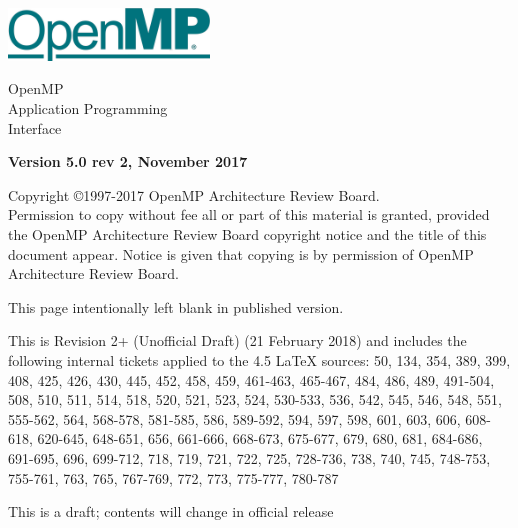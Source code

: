 
  \begin{titlepage}
    \begin{flushleft}
     \hspace{-6em} \includegraphics[width=0.4\textwidth]{openmp-logo.png}
    \end{flushleft}

    \begin{adjustwidth}{-0.75in}{0in}
    \begin{center}
      \Huge
      \textsf{OpenMP\\Application Programming\\Interface}

      \vspace{0.5in}\textsf{    }\vspace{-0.7in}
      \normalsize

      \vspace{1.0in}

      \textbf{Version 5.0 rev 2, November 2017}
    \end{center}
    \end{adjustwidth}

    \vspace{3.0in}

\begin{adjustwidth}{0pt}{1em}\setlength{\parskip}{0.25\baselineskip}%
Copyright \copyright 1997-2017 OpenMP Architecture Review Board.\\
Permission to copy without fee all or part of this material is granted,
provided the OpenMP Architecture Review Board copyright notice and
the title of this document appear. Notice is given that copying is by
permission of OpenMP Architecture Review Board.\end{adjustwidth}

  \end{titlepage}


\clearpage
\thispagestyle{empty}
\phantom{a}
This page intentionally left blank in published version.

This is Revision 2+ (Unofficial Draft) (21 February 2018) and
includes the following internal tickets applied to the 4.5 LaTeX sources:
50, 134, 354, 389, 399, 408, 425, 426, 430, 445, 452, 458, 459, 461-463, 
465-467, 484, 486, 489, 491-504, 508, 510, 511, 514, 518, 520, 521, 523, 
524, 530-533, 536, 542, 545, 546, 548, 551, 555-562, 564, 568-578, 581-585, 
586, 589-592, 594, 597, 598, 601, 603, 606, 608-618, 620-645, 
648-651, 656, 661-666, 668-673, 675-677, 679, 680, 681, 684-686, 691-695, 
696, 699-712, 718, 719, 721, 722, 725, 728-736, 738, 740, 745, 748-753, 
755-761, 763, 765, 767-769, 772, 773, 775-777, 780-787

This is a draft; contents will change in official release

\vfill

